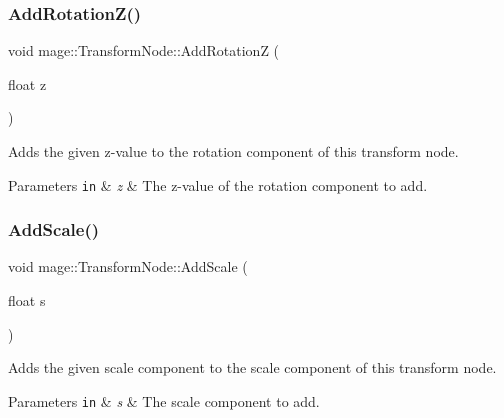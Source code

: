 \subsubsection{\texorpdfstring{Add\+Rotation\+Z()}{AddRotationZ()}}
{\footnotesize\ttfamily void mage\+::\+Transform\+Node\+::\+Add\+RotationZ (\begin{DoxyParamCaption}\item[{float}]{z }\end{DoxyParamCaption})\hspace{0.3cm}{\ttfamily [noexcept]}}

Adds the given z-\/value to the rotation component of this transform node.


\begin{DoxyParams}[1]{Parameters}
\mbox{\tt in}  & {\em z} & The z-\/value of the rotation component to add. \\
\hline
\end{DoxyParams}
\hypertarget{structmage_1_1_transform_node_ab548f51c982f7d40b28f328aa414b1dd}{}\label{structmage_1_1_transform_node_ab548f51c982f7d40b28f328aa414b1dd} 
\subsubsection{\texorpdfstring{Add\+Scale()}{AddScale()}\hspace{0.1cm}{\footnotesize\ttfamily [1/4]}}
{\footnotesize\ttfamily void mage\+::\+Transform\+Node\+::\+Add\+Scale (\begin{DoxyParamCaption}\item[{float}]{s }\end{DoxyParamCaption})\hspace{0.3cm}{\ttfamily [noexcept]}}

Adds the given scale component to the scale component of this transform node.


\begin{DoxyParams}[1]{Parameters}
\mbox{\tt in}  & {\em s} & The scale component to add. \\
\hline
\end{DoxyParams}
\hypertarget{structmage_1_1_transform_node_a1e1f63f4d326e0db6fb976f817e31643}{}\label{structmage_1_1_transform_node_a1e1f63f4d326e0db6fb976f817e31643} 
